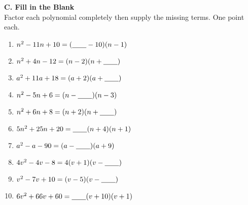     \vspace*{1.3ex}
    
    \noindent \textbf{C. Fill in the Blank} \\
    
    Factor each polynomial completely then supply the missing terms. One point each.
    
    \begin{enumerate}
    		\item $ n^2 - 11n + 10 = (\underline{\hspace{2em}} - 10)(n - 1) $
    		\item $ n^2 + 4n - 12 = (n - 2)(n + \underline{\hspace{2em}}) $
    		\item $ a^2 + 11a + 18 = (a + 2)(a + \underline{\hspace{2em}}) $
    		\item $ n^2 - 5n + 6 = (n - \underline{\hspace{2em}})(n - 3) $
    		\item $ n^2 + 6n + 8 = (n + 2) (n + \underline{\hspace{2em}}) $
    		\item $ 5n^2 + 25n + 20 = \underline{\hspace{2em}}(n + 4) (n + 1) $
    		\item $ a^2 - a - 90 = (a - \underline{\hspace{2em}}) (a + 9) $
    		\item $ 4v^2 - 4v - 8 = 4(v + 1) (v - \underline{\hspace{2em}}) $
    		\item $ v^2 - 7v + 10 = (v - 5) (v - \underline{\hspace{2em}}) $
    		\item $ 6v^2 + 66v + 60 = \underline{\hspace{2em}}(v + 10)(v + 1) $
    \end{enumerate}

    \newpage
    
